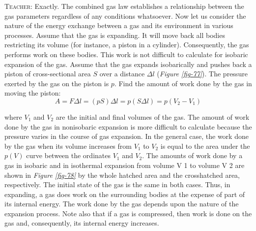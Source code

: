 \documentclass[a4paper,sfsidenotes]{tufte-book}
\begin{document}
\textsc{Teacher:} Exactly. The combined gas law establishes a relationship between the gas parameters regardless of any conditions whatsoever. Now let us consider the nature of the energy exchange between a gas and its environment in various processes. Assume that the gas is expanding. It will move back all bodies restricting its volume (for instance, a piston in a cylinder). Consequently, the gas performs work on these bodies. This work is not difficult to calculate for isobaric expansion of the gas. Assume that the gas expands isobarically and pushes back a piston of cross-sectional area $S$ over a distance $\Delta l$ (\emph{Figure \ref{fig-77}}). The pressure exerted by the gas on the piston is $p$. Find the amount of work done by the gas in moving the piston: 
\begin{equation}%
A = F \Delta l = (pS) \Delta l = p (S \Delta l) = p(V_{2} - V_{1})
\end{equation}

where $V_{1}$ and $V_{2}$ are the initial and final volumes of the gas. The amount of work done by the gas in nonisobaric expansion is more difficult to calculate because the pressure varies in the course of gas expansion. In the general case, the work done by the gas when its volume increases from $V_{1}$ to $V_{2}$ is equal to the area under the $p (V)$ curve between the ordinates $V_{1}$ and $V_{2}$. The amounts of work done by a gas in isobaric and in isothermal expansion from volume V 1 to volume V 2 are shown in \emph{Figure \ref{fig-78}} by the whole hatched area and the crosshatched area, respectively. The initial state of the gas is the same in both cases. Thus, in expanding, a gas does work on the surrounding bodies at the expense of part of its internal energy. The work done by the gas depends upon the nature of the expansion process. Note also that if a gas is compressed, then work is done on the gas and, consequently, its internal energy increases.
\end{document}
